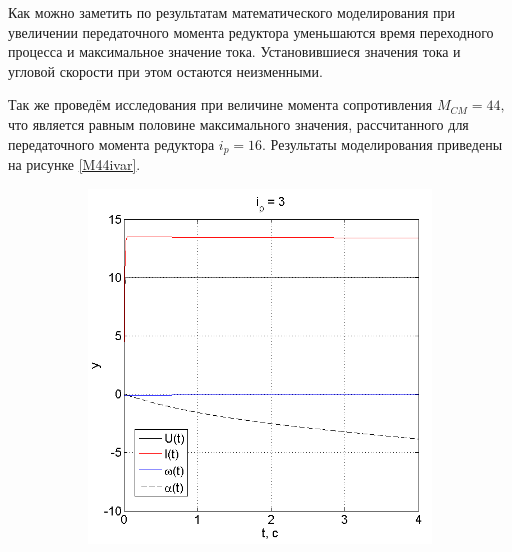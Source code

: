 \documentclass[fleqn, a4paper, 11pt, russian]{article}
\begin{document}
	Как можно заметить по результатам математического моделирования при увеличении передаточного момента редуктора уменьшаются время переходного процесса и максимальное значение тока. Установившиеся значения тока и угловой скорости при этом остаются неизменными.
	
	Так же проведём исследования при величине момента сопротивления $M_{CM} = 44,$ что является равным половине максимального значения, рассчитанного для передаточного момента редуктора $i_p = 16$. Результаты моделирования приведены на рисунке \ref{M44ivar}.
	\begin{figure}[ht!]
		\centering
		\begin{subfigure}[b]{0.45\textwidth}
			\includegraphics[width = \textwidth]{M44i3}
		\end{subfigure}
		\hfill
		\begin{subfigure}[b]{0.45\textwidth}

\end{subfigure}
\end{figure}
\end{document}
